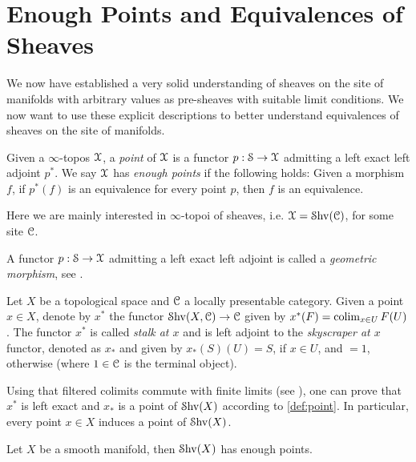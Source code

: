 \documentclass[10pt]{amsart}
\begin{document}
\section{Enough Points and Equivalences of Sheaves}
We now have established a very solid understanding of sheaves on the site of manifolds with arbitrary values as pre-sheaves with suitable limit conditions. We now want to use these explicit descriptions to better understand equivalences of sheaves on the site of manifolds.
\begin{definition}\label{def:point}
	Given a $\infty$-topos $\mathcal{X}$, a \emph{point} of $\mathcal{X}$ is a functor $p:\mathcal{S}\to\mathcal{X}$ admitting a left exact left adjoint $p^*$. We say $\mathcal{X}$ has \emph{enough points} if the following holds: Given a morphism $f$, if $p^*(f)$ is an equivalence for every point $p$, then $f$ is an equivalence.
\end{definition}
Here we are mainly interested in $\infty$-topoi of sheaves, i.e. $\mathcal{X}=\mathcal{S}\mathrm{hv}(\mathcal{C})$, for some site $\mathcal{C}$.
\begin{remark}
	A functor $p:\mathcal{S}\to\mathcal{X}$ admitting a left exact left adjoint is called a \emph{geometric morphism}, see \cite[Definition 6.3.1.1]{lurie2009htt}. 
\end{remark}
\begin{definition}\label{def:stalk}
	Let $X$ be a topological space and $\mathcal{C}$ a locally presentable category. Given a point $x\in X$, denote by $x^*$ the functor $\mathcal{S}\mathrm{hv}(X,\mathcal{C})\to\mathcal{C}$ given by $x^*(F)=\operatorname*{colim}_{x\in U}F(U)$. The functor $x^*$ is called 
	\emph{stalk at $x$} and is left adjoint to the \emph{skyscraper at $x$} functor, denoted as $x_*$ and given by $x_*(S)(U)=S$, if $x\in U$, and $=1$, otherwise (where $1\in\mathcal{C}$ is the terminal object).
\end{definition}
\begin{remark}\label{rmk:pointsheaf}
	Using that filtered colimits commute with finite limits (see \cite[Example 7.3.4.7]{lurie2009htt}), one can prove that $x^*$ is left exact and $x_*$ is a point of $\mathcal{S}\mathrm{hv}(X)$ according to \cref{def:point}. In particular, every point $x\in X$ induces a point of $\mathcal{S}\mathrm{hv}(X)$. 
\end{remark}
\begin{theorem}\label{thm:enougpoints}
	Let $X$ be a smooth manifold, then $\mathcal{S}\mathrm{hv}(X)$ has enough points. 
\end{theorem}
\end{document}
